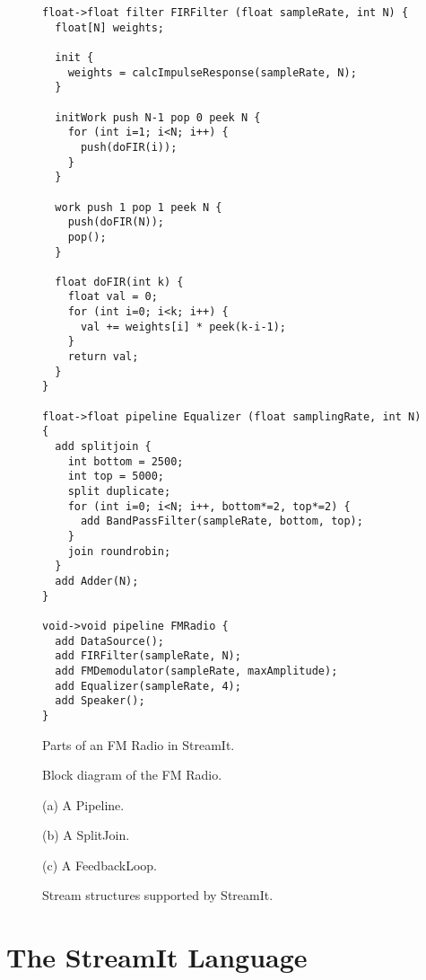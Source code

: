 \begin{figure}[t]
\scriptsize
\begin{verbatim}
float->float filter FIRFilter (float sampleRate, int N) {
  float[N] weights;

  init {
    weights = calcImpulseResponse(sampleRate, N);
  }

  initWork push N-1 pop 0 peek N {
    for (int i=1; i<N; i++) {
      push(doFIR(i));
    }
  }

  work push 1 pop 1 peek N {
    push(doFIR(N));
    pop();
  }

  float doFIR(int k) {
    float val = 0;
    for (int i=0; i<k; i++) {
      val += weights[i] * peek(k-i-1);
    }
    return val;
  }
}

float->float pipeline Equalizer (float samplingRate, int N) {
  add splitjoin {
    int bottom = 2500;
    int top = 5000;
    split duplicate;
    for (int i=0; i<N; i++, bottom*=2, top*=2) {
      add BandPassFilter(sampleRate, bottom, top);
    }
    join roundrobin;
  }
  add Adder(N);
}

void->void pipeline FMRadio {
  add DataSource();
  add FIRFilter(sampleRate, N);
  add FMDemodulator(sampleRate, maxAmplitude);
  add Equalizer(sampleRate, 4);
  add Speaker();
}
\end{verbatim}
\caption{Parts of an FM Radio in StreamIt.
\protect\label{fig:radiocode}}
\end{figure}

\begin{figure}[t]
\hspace{0.1in}
\caption{Block diagram of the FM Radio.
\protect\label{fig:radio-ascoded}}
\vspace{0.8in}
\vspace{10pt}

(a) A Pipeline. \\
\vspace{10pt}

(b) A SplitJoin. \\
\vspace{10pt}

(c) A FeedbackLoop. \\
\caption{Stream structures supported by StreamIt.
\protect\label{fig:structures}}
\end{figure}

\section{The StreamIt Language}
\label{sec:streamit}

